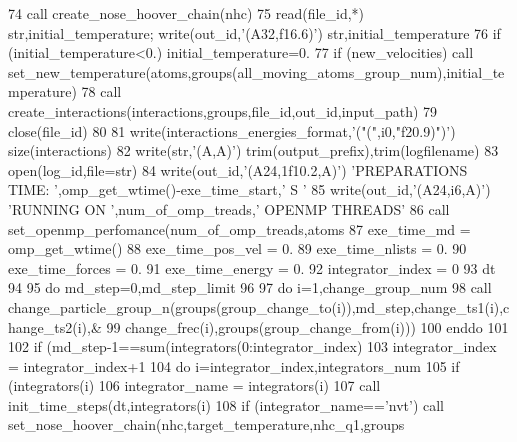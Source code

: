 \begin{DoxyCode}
74 \textcolor{keyword}{call }create\_nose\_hoover\_chain(nhc)
75 \textcolor{keyword}{read}(file\_id,*) str,initial\_temperature;                \textcolor{keyword}{write}(out\_id,\textcolor{stringliteral}{'(A32,f16.6)'}) str,initial\_temperature
76 \textcolor{keywordflow}{if} (initial\_temperature<0.) initial\_temperature=0.
77 \textcolor{keywordflow}{if} (new\_velocities) \textcolor{keyword}{call }set\_new\_temperature(atoms,groups(all\_moving\_atoms\_group\_num),initial\_temperature)
78 \textcolor{keyword}{call }create\_interactions(interactions,groups,file\_id,out\_id,input\_path)
79 \textcolor{keyword}{close}(file\_id)
80 
81 \textcolor{keyword}{write}(interactions\_energies\_format,\textcolor{stringliteral}{'("(",i0,"f20.9)")'}) \textcolor{keyword}{size}(interactions)
82 \textcolor{keyword}{write}(str,\textcolor{stringliteral}{'(A,A)'}) trim(output\_prefix),trim(logfilename)
83 \textcolor{keyword}{open}(log\_id,file=str)
84 \textcolor{keyword}{write}(out\_id,\textcolor{stringliteral}{'(A24,1f10.2,A)'}) \textcolor{stringliteral}{'PREPARATIONS TIME: '},omp\_get\_wtime()-exe\_time\_start,\textcolor{stringliteral}{' S '}
85 \textcolor{keyword}{write}(out\_id,\textcolor{stringliteral}{'(A24,i6,A)'}) \textcolor{stringliteral}{'RUNNING ON '},num\_of\_omp\_treads,\textcolor{stringliteral}{' OPENMP THREADS'}
86 \textcolor{keyword}{call }set\_openmp\_perfomance(num\_of\_omp\_treads,atoms%
87 exe\_time\_md = omp\_get\_wtime()
88 exe\_time\_pos\_vel = 0.
89 exe\_time\_nlists = 0.
90 exe\_time\_forces = 0.
91 exe\_time\_energy = 0.
92 integrator\_index = 0
93 dt%
94 
95 \textcolor{keywordflow}{do} md\_step=0,md\_step\_limit
96 
97     \textcolor{keywordflow}{do} i=1,change\_group\_num
98         \textcolor{keyword}{call }change\_particle\_group\_n(groups(group\_change\_to(i)),md\_step,change\_ts1(i),change\_ts2(i),&
99         change\_frec(i),groups(group\_change\_from(i)))
100 \textcolor{keywordflow}{    enddo}
101     
102     \textcolor{keywordflow}{if} (md\_step-1==sum(integrators(0:integrator\_index)%
103         integrator\_index = integrator\_index+1
104         \textcolor{keywordflow}{do} i=integrator\_index,integrators\_num
105             \textcolor{keywordflow}{if} (integrators(i)%
106                 integrator\_name = integrators(i)%
107                 \textcolor{keyword}{call }init\_time\_steps(dt,integrators(i)%
108                 \textcolor{keywordflow}{if} (integrator\_name==\textcolor{stringliteral}{'nvt'}) \textcolor{keyword}{call }set\_nose\_hoover\_chain(nhc,target\_temperature,nhc\_q1,groups

\end{DoxyCode}
